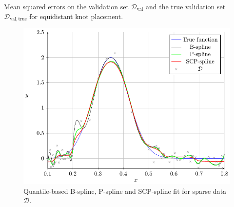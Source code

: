 \begin{table}[H]
	\begin{center}
	\end{center}
	\caption{Mean squared errors on the validation set $\mathcal{D}_{\mathrm{val}}$ and the true validation set $\mathcal{D}_{\mathrm{val},\mathrm{true}}$ for equidistant knot placement.}
	\label{tab:sparse-example-equidistant}
\end{table}


\begin{figure}[H]
	\centering
	\includegraphics{graphics/pgfplots/cha4/exp-sparse-quantile.pdf}
	\caption{Quantile-based B-spline, P-spline and SCP-spline fit for sparse data $\mathcal{D}$.}
	\label{fig:sparse-example-quantile}
\end{figure}

